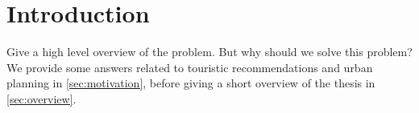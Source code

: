 \chapter{Introduction}
\label{ch:introduction}

Give a high level overview of the problem.
But why should we solve this problem? We provide some answers related to touristic
recommendations and urban planning in \autoref{sec:motivation}, before giving
a short overview of the thesis in \autoref{sec:overview}.




